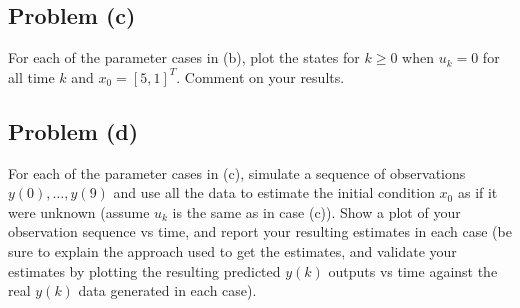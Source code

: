 \documentclass[11pt]{article}
\begin{document}
\subsection*{Problem (c)}
For each of the parameter cases in (b), plot the states for $k\geq0$ when $u_k=0$ for all time $k$ and $x_0=[5,1]^T$. Comment on your results.

\subsection*{Problem (d)}
For each of the parameter cases in (c), simulate a sequence of observations $y(0),\dots,y(9)$ and use all the data to estimate the initial condition $x_0$ as if it were unknown (assume $u_k$ is the same as in case (c)). Show a plot of your observation sequence vs time, and report your resulting estimates in each case (be sure to explain the approach used to get the estimates, and validate your estimates by plotting the resulting predicted $y(k)$ outputs vs time against the real $y(k)$ data generated in each case).
\end{document}
